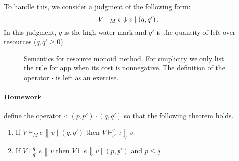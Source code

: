\documentclass[ manuscript,screen, nonacm]{acmart}
\begin{document}
To handle this, we consider a judgment of the following form:
\[
V \vdash_{M} e \Downarrow v \mid \left(q,q'\right).
\]
In this judgment, $q$ is the high-water mark and $q'$ is the quantity of left-over resources ($q, q' \geq 0$).

\begin{figure}[htb]
\centering
{}
 \caption{Semantics for resource monoid method. For simplicity we only list the rule for app when its cost is nonnegative. The definition of the operator $\cdot$ is left as an exercise.}
 \label{fig:sem-resource-monoid}
\end{figure}

\paragraph{Homework} define the operator $\cdot$: $(p,p') \cdot (q,q')$ so that the following theorem holds.

\begin{theorem}
\begin{enumerate}
    \item If $V\vdash_M e \Downarrow v \mid (q, q')$ then $V\vdash_{q'}^q e \Downarrow v $.
    \item If $V\vdash_{q'}^q e \Downarrow v$ then $V \vdash e \Downarrow v \mid (p, p')$ and $p\leq q$.
\end{enumerate}
  
\end{theorem}
\end{document}

